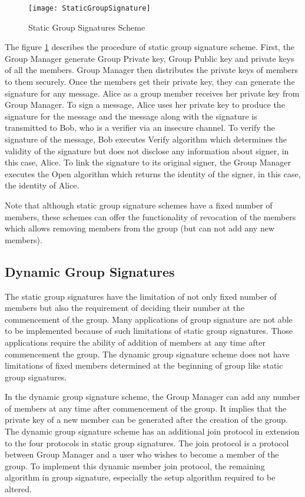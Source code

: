 \begin{figure}[h]
    \centering
    \texttt{[image: StaticGroupSignature]}
    \caption{Static Group Signatures Scheme}
    \label{fig:Static Group Signatures Scheme}
\end{figure}

The figure \ref{fig:Static Group Signatures Scheme} describes the procedure of static group signature scheme. First, the Group Manager generate Group Private key, Group Public key and private keys of all the members. Group Manager then distributes the private keys of members to them securely. Once the members get their private key, they can generate the signature for any message. Alice as a group member receives her private key from Group Manager. To sign a message, Alice uses her private key to produce the signature for the message and the message along with the signature is transmitted to Bob, who is a verifier via an insecure channel. To verify the signature of the message, Bob executes Verify algorithm which determines the validity of the signature but does not disclose any information about signer, in this case, Alice. To link the signature to its original signer, the Group Manager executes the Open algorithm which returns the identity of the signer, in this case, the identity of Alice. 

Note that although static group signature schemes have a fixed number of members, these schemes can offer the functionality of revocation of the members which allows removing members from the group (but can not add any new members).

\subsection{Dynamic Group Signatures}\label{sub:Dynamic Group Signatures}
The static group signatures have the limitation of not only fixed number of members but also the requirement of deciding their number at the commencement of the group. Many applications of group signature are not able to be implemented because of such limitations of static group signatures. Those applications require the ability of addition of members at any time after commencement the group. The dynamic group signature scheme does not have limitations of fixed members determined at the beginning of group like static group signatures.

In the dynamic group signature scheme, the Group Manager can add any number of members at any time after commencement of the group. It implies that the private key of a new member can be generated after the creation of the group. The dynamic group signature scheme has an additional join protocol in extension to the four protocols in static group signatures. The join protocol is a protocol between Group Manager and a user who wishes to become a member of the group. To implement this dynamic member join protocol, the remaining algorithm in group signature, especially the setup algorithm required to be altered.


